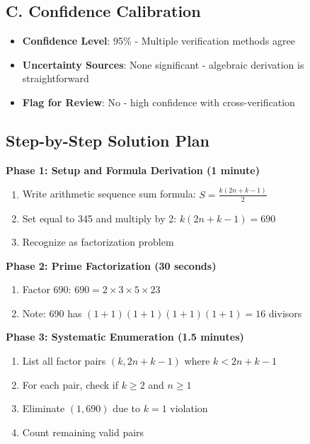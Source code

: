 \documentclass[11pt]{article}
\begin{document}
\begin{verificationbox}
\subsection*{C. Confidence Calibration}
\begin{itemize}[leftmargin=*]
    \item \textbf{Confidence Level}: 95\% - Multiple verification methods agree
    \item \textbf{Uncertainty Sources}: None significant - algebraic derivation is straightforward
    \item \textbf{Flag for Review}: No - high confidence with cross-verification
\end{itemize}
\end{verificationbox}

\begin{roadmapbox}
\subsection*{Step-by-Step Solution Plan}

\textbf{Phase 1: Setup and Formula Derivation (1 minute)}
\begin{enumerate}
    \item Write arithmetic sequence sum formula: $S = \frac{k(2n + k - 1)}{2}$
    \item Set equal to 345 and multiply by 2: $k(2n + k - 1) = 690$
    \item Recognize as factorization problem
\end{enumerate}

\textbf{Phase 2: Prime Factorization (30 seconds)}
\begin{enumerate}
    \item Factor 690: $690 = 2 \times 3 \times 5 \times 23$
    \item Note: 690 has $(1+1)(1+1)(1+1)(1+1) = 16$ divisors
\end{enumerate}

\textbf{Phase 3: Systematic Enumeration (1.5 minutes)}
\begin{enumerate}
    \item List all factor pairs $(k, 2n+k-1)$ where $k < 2n+k-1$
    \item For each pair, check if $k \geq 2$ and $n \geq 1$
    \item Eliminate $(1, 690)$ due to $k=1$ violation
    \item Count remaining valid pairs
\end{enumerate}


\end{roadmapbox}
\end{document}
